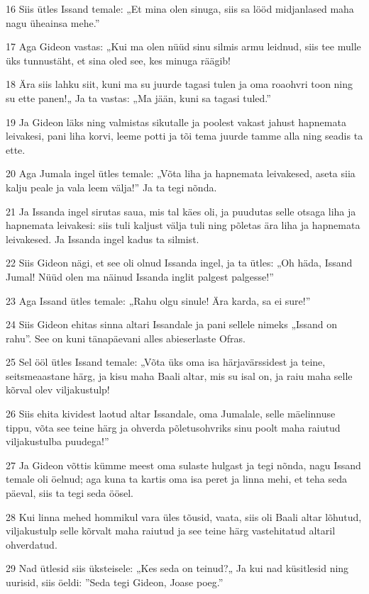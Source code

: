 \par 16 Siis ütles Issand temale: „Et mina olen sinuga, siis sa lööd midjanlased maha nagu üheainsa mehe.”
\par 17 Aga Gideon vastas: „Kui ma olen nüüd sinu silmis armu leidnud, siis tee mulle üks tunnustäht, et sina oled see, kes minuga räägib!
\par 18 Ära siis lahku siit, kuni ma su juurde tagasi tulen ja oma roaohvri toon ning su ette panen!„ Ja ta vastas: „Ma jään, kuni sa tagasi tuled.”
\par 19 Ja Gideon läks ning valmistas sikutalle ja poolest vakast jahust hapnemata leivakesi, pani liha korvi, leeme potti ja tõi tema juurde tamme alla ning seadis ta ette.
\par 20 Aga Jumala ingel ütles temale: „Võta liha ja hapnemata leivakesed, aseta siia kalju peale ja vala leem välja!” Ja ta tegi nõnda.
\par 21 Ja Issanda ingel sirutas saua, mis tal käes oli, ja puudutas selle otsaga liha ja hapnemata leivakesi: siis tuli kaljust välja tuli ning põletas ära liha ja hapnemata leivakesed. Ja Issanda ingel kadus ta silmist.
\par 22 Siis Gideon nägi, et see oli olnud Issanda ingel, ja ta ütles: „Oh häda, Issand Jumal! Nüüd olen ma näinud Issanda inglit palgest palgesse!”
\par 23 Aga Issand ütles temale: „Rahu olgu sinule! Ära karda, sa ei sure!”
\par 24 Siis Gideon ehitas sinna altari Issandale ja pani sellele nimeks „Issand on rahu”. See on kuni tänapäevani alles abieserlaste Ofras.
\par 25 Sel ööl ütles Issand temale: „Võta üks oma isa härjavärssidest ja teine, seitsmeaastane härg, ja kisu maha Baali altar, mis su isal on, ja raiu maha selle kõrval olev viljakustulp!
\par 26 Siis ehita kividest laotud altar Issandale, oma Jumalale, selle mäelinnuse tippu, võta see teine härg ja ohverda põletusohvriks sinu poolt maha raiutud viljakustulba puudega!”
\par 27 Ja Gideon võttis kümme meest oma sulaste hulgast ja tegi nõnda, nagu Issand temale oli öelnud; aga kuna ta kartis oma isa peret ja linna mehi, et teha seda päeval, siis ta tegi seda öösel.
\par 28 Kui linna mehed hommikul vara üles tõusid, vaata, siis oli Baali altar lõhutud, viljakustulp selle kõrvalt maha raiutud ja see teine härg vastehitatud altaril ohverdatud.
\par 29 Nad ütlesid siis üksteisele: „Kes seda on teinud?„ Ja kui nad küsitlesid ning uurisid, siis öeldi: ”Seda tegi Gideon, Joase poeg.”
